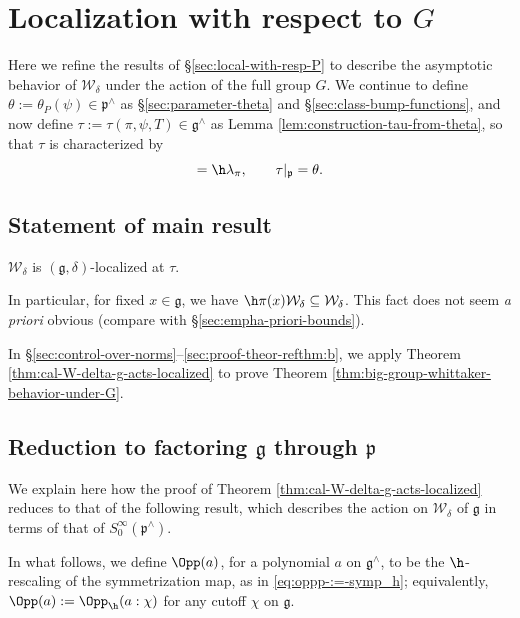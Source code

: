 \section{Localization with respect to $G$}\label{sec:local-with-resp}

Here we refine the results of \S\ref{sec:local-with-resp-P} to describe the asymptotic behavior of $\mathcal{W}_\delta$ under the action of the full group $G$.  We continue to define $\theta := \theta_P(\psi) \in \mathfrak{p}^\wedge$ as \S\ref{sec:parameter-theta} and \S\ref{sec:class-bump-functions}, and now define $\tau := \tau(\pi, \psi, T) \in \mathfrak{g}^\wedge$ as Lemma \ref{lem:construction-tau-from-theta}, so that $\tau$ is characterized by
\begin{equation*}
  [\tau] = \h \lambda_\pi, \qquad
  \tau|_{\mathfrak{p}} = \theta.
\end{equation*}

\subsection{Statement of main result}
\begin{theorem}\label{thm:cal-W-delta-g-acts-localized}
  $\mathcal{W}_{\delta}$ is
  $(\mathfrak{g},\delta)$-localized at $\tau$.
\end{theorem}
In particular, for fixed $x \in \mathfrak{g}$, we have $\h \pi(x) \mathcal{W}_\delta \subseteq \mathcal{W}_\delta$.  This fact does not seem \emph{a priori} obvious (compare with \S\ref{sec:empha-priori-bounds}).

In \S\ref{sec:control-over-norms}--\ref{sec:proof-theor-refthm:b}, we apply Theorem \ref{thm:cal-W-delta-g-acts-localized} to prove Theorem \ref{thm:big-group-whittaker-behavior-under-G}.

\subsection{Reduction to factoring $\mathfrak{g}$ through $\mathfrak{p}$}
We explain here how the proof of Theorem \ref{thm:cal-W-delta-g-acts-localized} reduces to that of the following result, which describes the action on $\mathcal{W}_\delta$ of $\mathfrak{g}$ in terms of that of $S^\infty_0(\mathfrak{p}^\wedge)$.

In what follows, we define $\Opp(a)$, for a polynomial $a$ on $\mathfrak{g}^\wedge$, to be the $\h$-rescaling of the symmetrization map, as in \eqref{eq:oppp-:=-symp_h}; equivalently, $\Opp(a) := \Opp_{\h}(a:\chi)$ for any cutoff $\chi$ on $\mathfrak{g}$.

